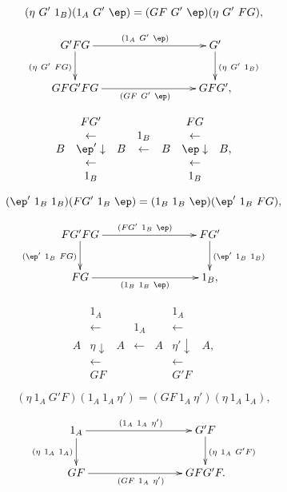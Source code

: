 \documentclass[12pt]{article}
\begin{document}
\begin{equation}\label{928c}
(\eta\ G'\ 1_B)(1_A\ G'\ \ep)=(GF\ G'\ \ep)(\eta\ G'\ FG),
\end{equation}

$$
\xymatrix{
G'FG\ar[rrr]^{(1_A\ G'\ \ep)}\ar[d]_{(\eta\ G'\ FG)}&&&G'\ar[d]^{(\eta\ G'\ 1_B)}\\ 
GFG'FG\ar[rrr]_{(GF\ G'\ \ep)}&&&GFG',}
$$


$$
\begin{array}{ccccccc}
&FG'&&&&FG\\
&\leftarrow&&1_B&&\leftarrow\\
B&\ep'\downarrow&B&\leftarrow&B&\ep\downarrow&B,\\
&\leftarrow&&&&\leftarrow\\
&1_B&&&&1_B
\end{array}
$$

\begin{equation}\label{928d}
(\ep'\ 1_B\ 1_B)(FG'\ 1_B\ \ep)=(1_B\ 1_B\ \ep)(\ep'\ 1_B\ FG),
\end{equation}

$$
\xymatrix{
FG'FG\ar[rrr]^{(FG'\ 1_B\ \ep)}\ar[d]_{(\ep'\ 1_B\ FG)}&&&FG'\ar[d]^{(\ep'\ 1_B\ 1_B)}\\ 
FG\ar[rrr]_{(1_B\ 1_B\ \ep)}&&&1_B,}
$$ 

\newpage

$$
\begin{array}{ccccccc}
&1_A&&&&1_A\\
&\leftarrow&&1_A&&\leftarrow\\
A&\eta\downarrow&A&\leftarrow&A&\eta'\downarrow&A,\\
&\leftarrow&&&&\leftarrow\\
&GF&&&&G'F
\end{array}
$$

\begin{equation}\label{928e}
(\eta\ 1_A\ G'F)(1_A\ 1_A\ \eta')=(GF\ 1_A\ \eta')(\eta\ 1_A\ 1_A),
\end{equation}

$$
\xymatrix{
1_A\ar[rrr]^{(1_A\ 1_A\ \eta')}\ar[d]_{(\eta\ 1_A\ 1_A)}&&&G'F\ar[d]^{(\eta\ 1_A\ G'F)}\\ 
GF\ar[rrr]_{(GF\ 1_A\ \eta')}&&&GFG'F.}
$$ 


\end{document}
